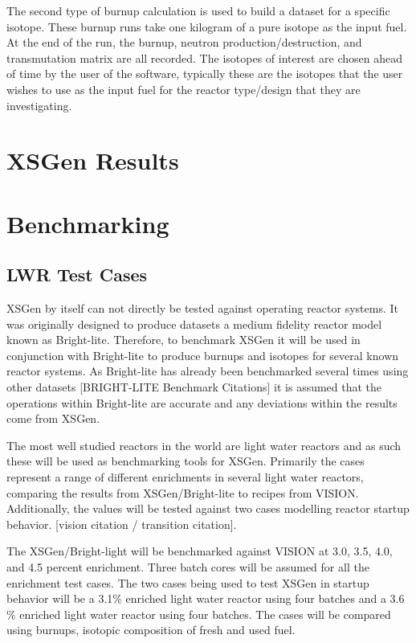 \documentclass{article}
\begin{document}
The second type of burnup calculation is used to build a dataset for a specific isotope. These burnup runs take one kilogram of a pure isotope as the input fuel. At the end of the run, the burnup, neutron production/destruction, and transmutation matrix are all recorded. The isotopes of interest are chosen ahead of time by the user of the software, typically these are the isotopes that the user wishes to use as the input fuel for the reactor type/design that they are investigating.

\section{XSGen Results}

\section{Benchmarking}
\subsection{LWR Test Cases}
XSGen by itself can not directly be tested against operating reactor systems. It was originally designed to produce datasets a medium fidelity reactor model known as Bright-lite. Therefore, to benchmark XSGen it will be used in conjunction with Bright-lite to produce burnups and isotopes for several known reactor systems.  As Bright-lite has already been benchmarked several times using other datasets [BRIGHT-LITE Benchmark Citations] it is assumed that the operations within Bright-lite are accurate and any deviations within the results come from XSGen.

The most well studied reactors in the world are light water reactors and as such these will be used as benchmarking tools for XSGen. Primarily the cases represent a range of different enrichments in several light water reactors, comparing the results from XSGen/Bright-lite to recipes from VISION. Additionally, the values will be tested against two cases modelling reactor startup behavior.  [vision citation / transition citation].

The XSGen/Bright-light will be benchmarked against VISION at 3.0, 3.5, 4.0, and 4.5 percent enrichment. Three batch cores will be assumed for all the enrichment test cases.
The two cases being used to test XSGen in startup behavior will be a 3.1$\%$ enriched light water reactor using four batches and a 3.6$\%$ enriched light water reactor using four batches. The cases will be compared using burnups, isotopic composition of fresh and used fuel.
\end{document}
